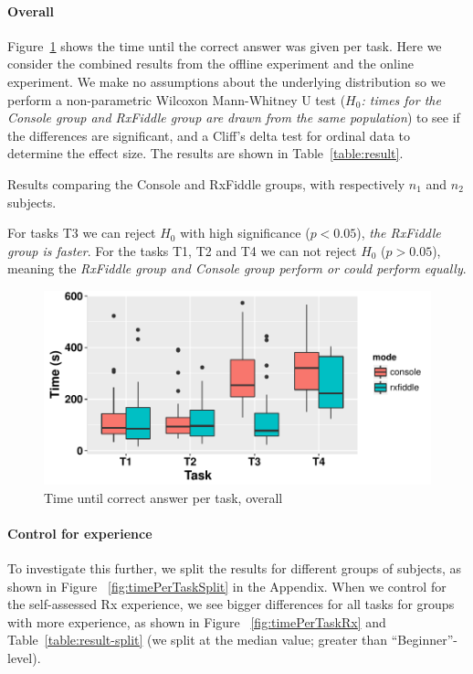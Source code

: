 \paragraph{Overall} Figure~\ref{fig:timePerTask} 
shows the time until the correct answer was given
per task.  Here we consider the combined results from the offline experiment
and the online experiment.  We make no assumptions about the underlying
distribution so we perform a non-parametric Wilcoxon Mann-Whitney U test
(\textit{$ H_0 $:  times for the Console group and RxFiddle group are
drawn from the same population}) to see if the differences are
significant, and a Cliff's delta test for ordinal data to determine the
effect size. The results are shown in Table~\ref{table:result}.

\begin{table}[h!]
    {\centering}
    \caption{Results comparing the Console and RxFiddle groups, with 
    respectively $n_1$ and $n_2$ subjects.}
    \label{table:result}
\end{table}

For tasks T3 we can reject $ H_0 $ with high significance ($ p < 0.05 $),
\emph{the RxFiddle group is faster}.  For the tasks T1, T2 and T4 we can
not reject $ H_0 $ ($ p > 0.05 $), meaning the \emph{RxFiddle group and
Console group perform or could perform equally}.

\begin{figure}[t]
    \includegraphics[width=\columnwidth]{images/timePerTask.pdf}
    \caption{Time until correct answer per task, overall}%
    \label{fig:timePerTask}
\end{figure}

\paragraph{Control for experience} To investigate this further, we split
the results for different groups of subjects, as shown in Figure~%
\ref{fig:timePerTaskSplit} in the Appendix.  When we control for the
self-assessed Rx experience, we see bigger differences for all tasks for groups
with more experience, as shown in Figure~%
\ref{fig:timePerTaskRx} and Table~\ref{table:result-split} (we split at the 
median value; greater than ``Beginner''-level).

